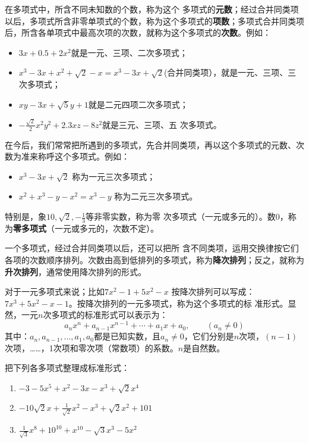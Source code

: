 在多项式中，所含不同未知数的个数，称为这个
多项式的\textbf{元数}；经过合并同类项以后，多项式所含非零单项式的个数，称为这个多项式的\textbf{项数}；多项式合并同类项后，所含各单项式中最高次项的次数，就称为这个多项式的\textbf{次数}。例如：
\begin{itemize}
    \item $3x+0.5+2x^2$就是一元、三项、二次多项式；
    \item $x^3-3x+x^2+\sqrt{2}-x=x^3-3x+\sqrt{2}$(合并同类项），就是一元、三项、三次多项式；
    \item $xy-3x+\sqrt{5}y+1$就是二元四项二次多项式；
    \item $-\frac{\sqrt{2}}{2}x^2y^2 +2.3xz-8z^2$就是三元、三项、五
次多项式。
\end{itemize}

在今后，我们常常把所遇到的多项式，先合并同类项，再以这个多项式的元数、次数为准来称呼这个多项式。例如：
\begin{itemize}
    \item $x^3-3x+\sqrt{2}$ 称为一元三次多项式；
    \item $x^2+x^3-y-x^2=x^3-y$ 称为二元三次多项式。
\end{itemize}
特别是，象$10,\sqrt{2},-\frac{1}{3}$等非零实数，称为零
次多项式（一元或多元的）。数0，称为\textbf{零多项式}（一元或多元的，次数不定）。

一个多项式，经过合并同类项以后，还可以把所
含不同类项，运用交换律按它们各项的次数顺序排列。次数由高到低排列的多项式，称为\textbf{降次排列}；反之，就称为\textbf{升次排列}，通常使用降次排列的形式。

对于一元多项式来说；比如$7x^2-1+5x^2-x$ 按降次排列可以写成：
$7x^3+5x^2-x-1$。按降次排列的一元多项式，称为这个多项式的标
准形式。显然，一元$n$次多项式的标准形式可以表示为：
\[a_nx^n+a_{n-1}x^{n-1}+\cdots +a_1x+a_0,\qquad (a_n\ne 0) \]
其中：$a_n,a_{n-1},\ldots,a_1,a_0$都是已知实数，且$a_n\ne 0$，它们分别是$n$次项，$(n-1)$次项，……，1次项和零次项（常数项）的系数。$n$是自然数。

\begin{example}
    把下列各多项式整理成标准形式：
    \begin{enumerate}
        \item $-3-5x^5+x^2-3x-x^3+\sqrt{2}x^4$
        \item $-10\sqrt{2}x+\frac{1}{\sqrt{2}}x^2-x^3+\sqrt{2}x^2+101$
        \item $\frac{1}{\sqrt{3}}x^8+10^{10}+x^{10}-\sqrt{3}x^3-5x^2$
    \end{enumerate}
\end{example}

